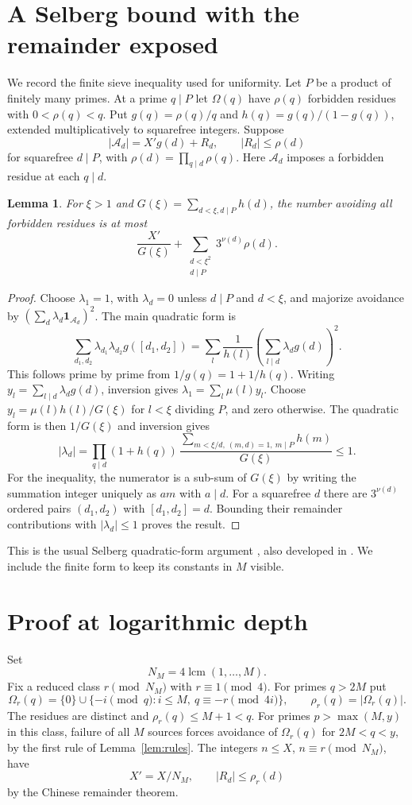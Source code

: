 \documentclass[11pt,a4paper]{amsart}
\newtheorem{lemma}[theorem]{Lemma}
\theoremstyle{definition}\newtheorem{definition}[theorem]{Definition}
\DeclareMathOperator{\lcm}{lcm}
\begin{document}
\section{A Selberg bound with the remainder exposed}\label{sec:selberg}
We record the finite sieve inequality used for uniformity.
Let $P$ be a product of finitely many primes. At a prime $q\mid P$
let $\Omega(q)$ have $\rho(q)$ forbidden residues with $0<\rho(q)<q$.
Put $g(q)=\rho(q)/q$ and $h(q)=g(q)/(1-g(q))$, extended
multiplicatively to squarefree integers. Suppose
\[
 |\mathcal A_d|=X'g(d)+R_d,\qquad |R_d|\le\rho(d)
\]
for squarefree $d\mid P$, with $\rho(d)=\prod_{q\mid d}\rho(q)$.
Here $\mathcal A_d$ imposes a forbidden residue at each $q\mid d$.
\begin{lemma}\label{lem:selberg}
For $\xi>1$ and $G(\xi)=\sum_{d<\xi,d\mid P}h(d)$,
the number avoiding all forbidden residues is at most
\[
 \frac{X'}{G(\xi)}
 +\sum_{\substack{d<\xi^2\\d\mid P}}3^{\nu(d)}\rho(d).
\]
\end{lemma}
\begin{proof}
Choose $\lambda_1=1$, with $\lambda_d=0$ unless $d\mid P$ and
$d<\xi$, and majorize avoidance by
$(\sum_{d}\lambda_d\mathbf1_{\mathcal A_d})^2$.
The main quadratic form is
\[
 \sum_{d_1,d_2}\lambda_{d_1}\lambda_{d_2}g([d_1,d_2])
 =\sum_l\frac1{h(l)}
       \left(\sum_{l\mid d}\lambda_d g(d)\right)^2.
\]
This follows prime by prime from $1/g(q)=1+1/h(q)$.
Writing $y_l=\sum_{l\mid d}\lambda_dg(d)$, inversion gives
$\lambda_1=\sum_l\mu(l)y_l$. Choose
$y_l=\mu(l)h(l)/G(\xi)$ for $l<\xi$ dividing $P$, and zero otherwise.
The quadratic form is then $1/G(\xi)$ and inversion gives
\[
 |\lambda_d|=
 \prod_{q\mid d}(1+h(q))\,
 \frac{\sum_{m<\xi/d,\ (m,d)=1,\ m\mid P}h(m)}{G(\xi)}
 \le1.
\]
For the inequality, the numerator is a sub-sum of $G(\xi)$
by writing the summation integer uniquely as $am$ with $a\mid d$.
For a squarefree $d$ there are $3^{\nu(d)}$ ordered pairs
$(d_1,d_2)$ with $[d_1,d_2]=d$. Bounding their remainder
contributions with $|\lambda_d|\le1$ proves the result.
\end{proof}
This is the usual Selberg quadratic-form argument
\cite[Chapter~9]{Richert}, also developed in \cite{HR}.
We include the finite form to keep its constants in $M$ visible.

\section{Proof at logarithmic depth}
Set
\[
 N_M=4\lcm(1,\ldots,M).
\]
Fix a reduced class $r\pmod{N_M}$ with $r\equiv1\pmod4$.
For primes $q>2M$ put
\[
 \Omega_r(q)=\{0\}\cup
   \{-i\pmod q:i\le M,\ q\equiv-r\pmod{4i}\},\qquad
 \rho_r(q)=|\Omega_r(q)|.
\]
The residues are distinct and $\rho_r(q)\le M+1<q$.
For primes $p>\max(M,y)$ in this class, failure of all $M$
sources forces avoidance of $\Omega_r(q)$ for $2M<q<y$,
by the first rule of Lemma~\ref{lem:rules}. The integers
$n\le X$, $n\equiv r\pmod{N_M}$, have
\[
 X'=X/N_M,\qquad |R_d|\le\rho_r(d)
\]
by the Chinese remainder theorem.
\end{document}
